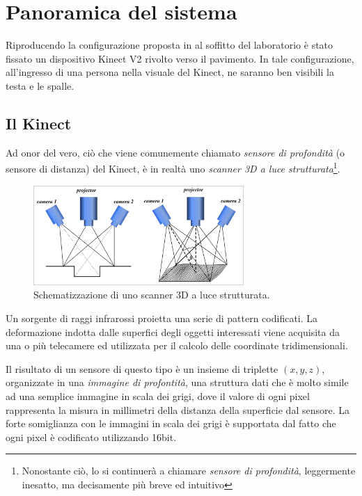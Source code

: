 
\chapter{Panoramica del sistema}
\label{cap:overview}
Riproducendo la configurazione proposta in \cite{Zhu13} al soffitto del laboratorio è stato fissato un dispositivo Kinect V2 rivolto verso il pavimento.
In tale configurazione, all'ingresso di una persona nella visuale del Kinect, ne saranno ben visibili la testa e le spalle.

\section{Il Kinect}
\label{sec:sensor}
Ad onor del vero, ciò che viene comunemente chiamato \emph{sensore di profondità} (o sensore di distanza) del Kinect, è in realtà uno \emph{scanner 3D a luce strutturata}\footnote{Nonostante ciò, lo si continuerà a chiamare \emph{sensore di profondità}, leggermente inesatto, ma decisamente più breve ed intuitivo}.
\begin{figure}
    \begin{center}
        \includegraphics[width=8cm]{img/3d-structured-light-scanner.png}
    \end{center}
    \label{fig:structured_light_scanner}
    \caption{Schematizzazione di uno scanner 3D a luce strutturata.}
\end{figure}
Un sorgente di raggi infrarossi proietta una serie di pattern codificati. La deformazione indotta dalle superfici degli oggetti interessati viene acquisita da una o più telecamere ed utilizzata per il calcolo delle coordinate tridimensionali.

Il risultato di un sensore di questo tipo è un insieme di triplette $(x,y,z)$, organizzate in una \emph{immagine di profontità}, una struttura dati che è molto simile ad una semplice immagine in scala dei grigi, dove il valore di ogni pixel rappresenta la misura in millimetri della distanza della superficie dal sensore.
La forte somiglianza con le immagini in scala dei grigi è supportata dal fatto che ogni pixel è codificato utilizzando 16bit.

